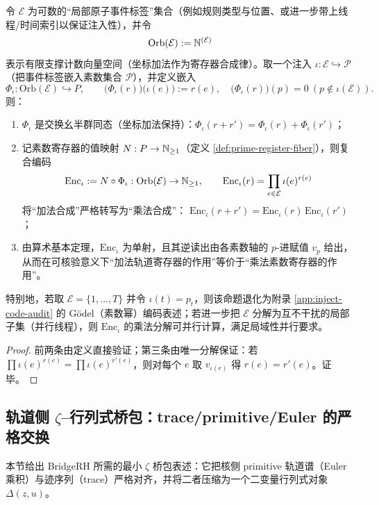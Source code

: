 \begin{proposition}\label{prop:orbit-register-eq-prime-register}
令 $\mathcal{E}$ 为可数的“局部原子事件标签”集合（例如规则类型与位置、或进一步带上线程/时间索引以保证注入性），并令
$$
\mathrm{Orb}(\mathcal{E}):=\mathbb{N}^{(\mathcal{E})}
$$
表示有限支撑计数向量空间（坐标加法作为寄存器合成律）。取一个注入
$
\iota:\mathcal{E}\hookrightarrow \mathcal{P}
$
（把事件标签嵌入素数集合 $\mathcal{P}$），并定义嵌入
$$
\Phi_\iota:\mathrm{Orb}(\mathcal{E})\hookrightarrow P,\qquad
\bigl(\Phi_\iota(r)\bigr)\bigl(\iota(e)\bigr):=r(e),\quad
\bigl(\Phi_\iota(r)\bigr)(p)=0\ (p\notin \iota(\mathcal{E})).
$$
则：
\begin{enumerate}
  \item $\Phi_\iota$ 是交换幺半群同态（坐标加法保持）：$\Phi_\iota(r+r')=\Phi_\iota(r)+\Phi_\iota(r')$；
  \item 记素数寄存器的值映射 $N:P\to\mathbb{N}_{\ge 1}$（定义 \ref{def:prime-register-fiber}），则复合编码
  $$
  \mathrm{Enc}_\iota:=N\circ \Phi_\iota:\mathrm{Orb}(\mathcal{E})\to \mathbb{N}_{\ge 1},
  \qquad
  \mathrm{Enc}_\iota(r)=\prod_{e\in\mathcal{E}} \iota(e)^{r(e)}
  $$
  将“加法合成”严格转写为“乘法合成”：
  $
  \mathrm{Enc}_\iota(r+r')=\mathrm{Enc}_\iota(r)\,\mathrm{Enc}_\iota(r')
  $；
  \item 由算术基本定理，$\mathrm{Enc}_\iota$ 为单射，且其逆读出由各素数轴的 $p$-进赋值 $v_p$ 给出，从而在可核验意义下“加法轨道寄存器的作用”等价于“乘法素数寄存器的作用”。
\end{enumerate}
特别地，若取 $\mathcal{E}=\{1,\dots,T\}$ 并令 $\iota(t)=p_t$，则该命题退化为附录 \ref{app:inject-code-audit} 的 Gödel（素数幂）编码表述；若进一步把 $\mathcal{E}$ 分解为互不干扰的局部子集（并行线程），则 $\mathrm{Enc}_\iota$ 的乘法分解可并行计算，满足局域性并行要求。
\end{proposition}
\begin{proof}
前两条由定义直接验证；第三条由唯一分解保证：若 $\prod \iota(e)^{r(e)}=\prod \iota(e)^{r'(e)}$，则对每个 $e$ 取 $v_{\iota(e)}$ 得 $r(e)=r'(e)$。证毕。
\end{proof}

\subsection{轨道侧 \texorpdfstring{$\zeta$}{zeta}–行列式桥包：trace/primitive/Euler 的严格交换}\label{subsec:zeta-det-bridge}
本节给出 BridgeRH 所需的最小 $\zeta$ 桥包表述：它把核侧 primitive 轨道谱（Euler 乘积）与迹序列（trace）严格对齐，并将二者压缩为一个二变量行列式对象 $\Delta(z,u)$。

